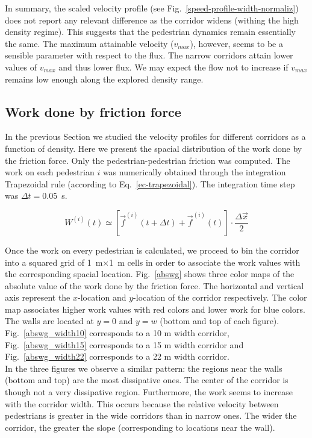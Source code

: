 \documentclass[preprint,12pt]{elsarticle}
\begin{document}
In summary, the scaled velocity profile (see Fig.~\ref{speed-profile-width-normaliz}) does not report any relevant difference as the corridor widens (withing the high density regime). This suggests that the pedestrian dynamics remain essentially the same. The maximum attainable velocity ($v_{max}$), however, seems to be a sensible parameter with respect to the flux.  The narrow corridors attain lower values of $v_{max}$ and thus lower flux. We may expect the flow not to increase if $v_{max}$ remains low enough along the explored density range.\\

\subsection{Work done by friction force}

In the previous Section we studied the velocity profiles for different corridors as a function of density. Here we present the spacial distribution of the work done by the friction force. Only the pedestrian-pedestrian friction was computed.
The work on each pedestrian $i$ was numerically obtained through the integration Trapezoidal rule (according to Eq.~\ref{ec-trapezoidal}). The integration time step was $\Delta t = 0.05$~s. 

\begin{equation}
W^{(i)}(t) \simeq \left [ \vec{f}^{(i)}(t+\Delta t) + \vec{f}^{(i)}(t)  \right ]\cdot \frac{\Delta \vec{x}}{2} \label{ec-trapezoidal}
\end{equation}

Once the work on every pedestrian is calculated, we proceed to bin the corridor into a squared grid of 1~m$\times$1~m cells in order to associate the work values with the corresponding spacial location. Fig.~\ref{abswg} shows three color maps of the absolute value of the work done by the friction force. The horizontal and vertical axis represent the $x$-location and $y$-location of the corridor respectively. The color map associates higher work values with red colors and lower work for blue colors. The walls are located at $y=0$ and $y=w$ (bottom and top of each figure). Fig.~\ref{abswg_width10} corresponds to a 10 m width corridor, Fig.~\ref{abswg_width15} corresponds to a 15 m width corridor and Fig.~\ref{abswg_width22} corresponds to a 22 m width corridor.\\

In the three figures we observe a similar pattern: the regions near the walls (bottom and top) are the most dissipative ones. The center of the corridor is though not a very dissipative region. Furthermore, the work seems to increase with the corridor width. This occurs because the relative velocity between pedestrians is greater in the wide corridors than in narrow ones. The wider the corridor, the greater the slope (corresponding to locations near the wall).\\
\end{document}
